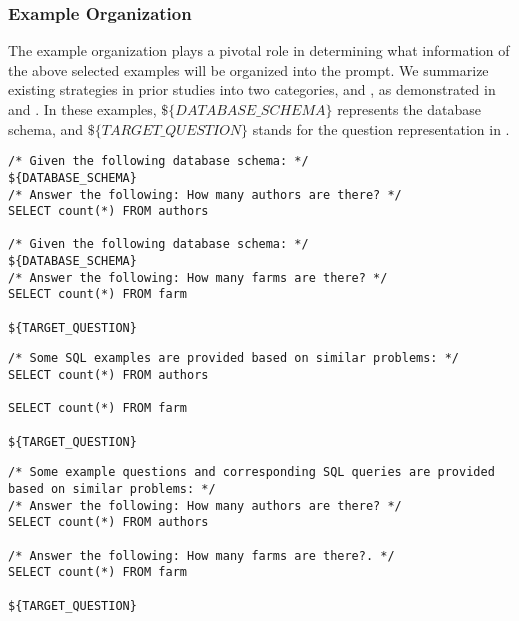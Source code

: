 \subsubsection{Example Organization} 
The example organization plays a pivotal role in determining what information of the above selected examples will be organized into the prompt. 
We summarize existing strategies in prior studies into two categories, \fiorg and \sqlorg, 
as demonstrated in  and . 
In these examples, $\textit{\$\{DATABASE\_SCHEMA\}}$ represents the database schema, and $\textit{\$\{TARGET\_QUESTION\}}$ stands for the question representation in .

\begin{lstlisting}[language=Prompt, label={lst:org_complete}, caption={Example of \fiorg.}, float=t]
/* Given the following database schema: */
${DATABASE_SCHEMA}
/* Answer the following: How many authors are there? */
SELECT count(*) FROM authors

/* Given the following database schema: */
${DATABASE_SCHEMA}
/* Answer the following: How many farms are there? */
SELECT count(*) FROM farm

${TARGET_QUESTION}
\end{lstlisting}

\begin{lstlisting}[language=Prompt, label={lst:org_sql}, caption={Example of \sqlorg.}, float=t]
/* Some SQL examples are provided based on similar problems: */
SELECT count(*) FROM authors

SELECT count(*) FROM farm

${TARGET_QUESTION}
\end{lstlisting}

\begin{lstlisting}[language=Prompt, label={lst:org_qa}, caption={Example of \pairorg.}, float=t]
/* Some example questions and corresponding SQL queries are provided based on similar problems: */
/* Answer the following: How many authors are there? */
SELECT count(*) FROM authors

/* Answer the following: How many farms are there?. */
SELECT count(*) FROM farm

${TARGET_QUESTION}
\end{lstlisting}

